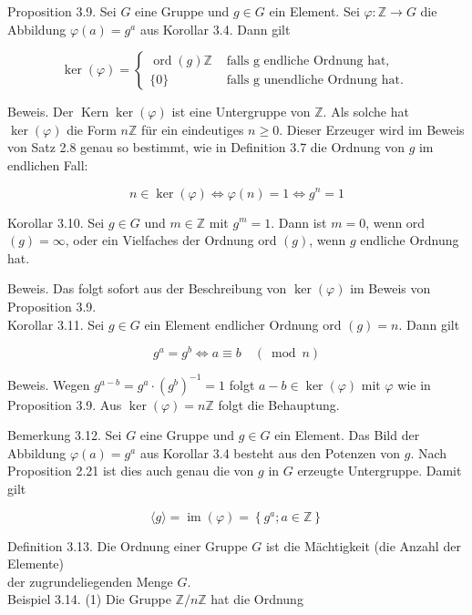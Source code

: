 \documentclass[10pt, letterpaper]{article}
\begin{document}
Proposition 3.9. Sei $G$ eine Gruppe und $g \in G$ ein Element. Sei $\varphi: \mathbb{Z} \rightarrow G$ die Abbildung $\varphi(a)=g^{a}$ aus Korollar 3.4. Dann gilt

$$
\operatorname{ker}(\varphi)= \begin{cases}\operatorname{ord}(g) \mathbb{Z} & \text { falls g endliche Ordnung hat, } \\ \{0\} & \text { falls g unendliche Ordnung hat. }\end{cases}
$$

Beweis. Der $\operatorname{Kern} \operatorname{ker}(\varphi)$ ist eine Untergruppe von $\mathbb{Z}$. Als solche hat $\operatorname{ker}(\varphi)$ die Form $n \mathbb{Z}$ für ein eindeutiges $n \geq 0$. Dieser Erzeuger wird im Beweis von Satz 2.8 genau so bestimmt, wie in Definition 3.7 die Ordnung von $g$ im endlichen Fall:

$$
n \in \operatorname{ker}(\varphi) \Longleftrightarrow \varphi(n)=1 \Longleftrightarrow g^{n}=1
$$

Korollar 3.10. Sei $g \in G$ und $m \in \mathbb{Z}$ mit $g^{m}=1$. Dann ist $m=0$, wenn ord $(g)=\infty$, oder ein Vielfaches der Ordnung ord $(g)$, wenn $g$ endliche Ordnung hat.

Beweis. Das folgt sofort aus der Beschreibung von $\operatorname{ker}(\varphi)$ im Beweis von Proposition 3.9.\\
Korollar 3.11. Sei $g \in G$ ein Element endlicher Ordnung ord $(g)=n$. Dann gilt

$$
g^{a}=g^{b} \Longleftrightarrow a \equiv b \quad(\bmod n)
$$

Beweis. Wegen $g^{a-b}=g^{a} \cdot\left(g^{b}\right)^{-1}=1$ folgt $a-b \in \operatorname{ker}(\varphi)$ mit $\varphi$ wie in Proposition 3.9. Aus $\operatorname{ker}(\varphi)=n \mathbb{Z}$ folgt die Behauptung.

Bemerkung 3.12. Sei $G$ eine Gruppe und $g \in G$ ein Element. Das Bild der Abbildung $\varphi(a)=g^{a}$ aus Korollar 3.4 besteht aus den Potenzen von $g$. Nach Proposition 2.21 ist dies auch genau die von $g$ in $G$ erzeugte Untergruppe. Damit gilt

$$
\langle g\rangle=\operatorname{im}(\varphi)=\left\{g^{a} ; a \in \mathbb{Z}\right\}
$$

Definition 3.13. Die Ordnung einer Gruppe $G$ ist die Mächtigkeit (die Anzahl der Elemente)\\
der zugrundeliegenden Menge $G$.\\
Beispiel 3.14. (1) Die Gruppe $\mathbb{Z} / n \mathbb{Z}$ hat die Ordnung
\end{document}
